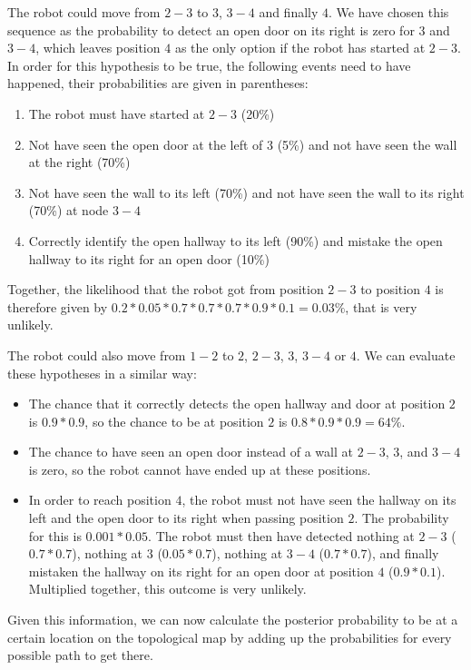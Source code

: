 The robot could move from $2-3$ to $3$, $3-4$ and finally $4$. We have chosen this sequence as the probability to detect an open door on its right is zero for $3$ and $3-4$, which leaves position $4$ as the only option if the robot has started at $2-3$. In order for this hypothesis to be true, the following events need to have happened, their probabilities are given in parentheses:
\begin{enumerate}
\item The robot must have started at $2-3$ (20\%)
\item Not have seen the open door at the left of $3$ (5\%) and not have seen the wall at the right (70\%)
\item Not have seen the wall to its left (70\%) and not have seen the wall to its right (70\%) at node $3-4$
\item Correctly identify the open hallway to its left (90\%) and mistake the open hallway to its right for an open door (10\%)
\end{enumerate}
Together, the likelihood that the robot got from position $2-3$ to position $4$ is therefore given by $0.2*0.05*0.7*0.7*0.7*0.9*0.1=0.03\%$, that is very unlikely.


The robot could also move from $1-2$ to $2$, $2-3$, $3$, $3-4$ or $4$. We can evaluate these hypotheses in a similar way:
\begin{itemize}
\item The chance that it correctly detects the open hallway and door at position $2$ is $0.9*0.9$, so the chance to be at position $2$ is
$0.8*0.9*0.9=64\%$.
\item The chance to have seen an open door instead of a wall at $2-3$, $3$, and $3-4$ is zero, so the robot cannot have ended up at these positions.
\item In order to reach position $4$, the robot must not have seen the hallway on its left and the open door to its right when passing position $2$. The probability for this is $0.001*0.05$. The robot must then have detected nothing at $2-3$ ($0.7*0.7$), nothing at $3$ ($0.05*0.7$), nothing at $3-4$ ($0.7*0.7$), and finally mistaken the hallway on its right for an open door at position $4$ ($0.9*0.1$). Multiplied together, this outcome is very unlikely.
\end{itemize}

Given this information, we can now calculate the posterior probability to be at a certain location on the topological map by adding up the probabilities for every possible path to get there. 

